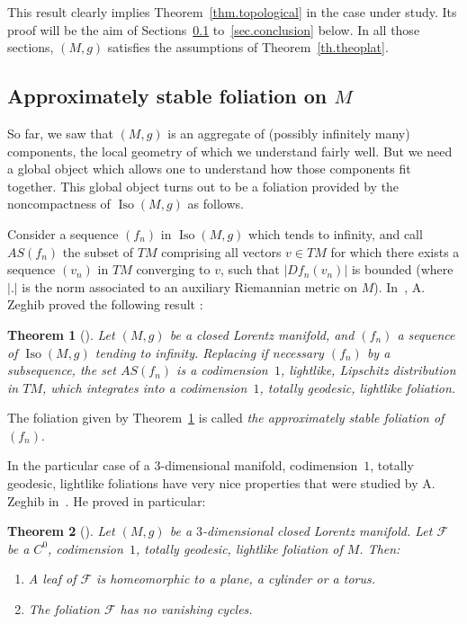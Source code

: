 \documentclass[11pt]{article}
\newtheorem{theo}{Theorem}[section]
\theoremstyle{definition}
\numberwithin{equation}{section}
\numberwithin{figure}{section}
\numberwithin{table}{section}
\DeclareMathOperator{\Iso}{Iso}
\newcommand{\calf}{\mathcal{F}}
\begin{document}
This result clearly implies Theorem~\ref{thm.topological} in the case under study. Its proof will be the aim of Sections~\ref{sec.approximately} to~\ref{sec.conclusion} below. In all those sections, $(M,g)$ satisfies the assumptions of Theorem~\ref{th.theoplat}.

\subsection{Approximately stable foliation on \texorpdfstring{${M}$}{M}}\label{sec.approximately}
So far, we saw that $(M,g)$ is an aggregate of (possibly infinitely many) components, the local geometry of which we understand fairly well. But we need a global object which allows one to understand how those components fit together. This global object turns out to be a foliation provided by the noncompactness of $\Iso(M,g)$ as follows.



Consider a sequence $(f_n)$ in $\Iso(M,g)$ which tends to infinity, and call $AS(f_n)$ the subset of $TM$ comprising all vectors $v \in TM$ for which there exists a sequence $(v_n)$ in $TM$ converging to $v$, such that $|Df_n(v_n)|$ is bounded (where $|.|$ is the norm associated to an auxiliary Riemannian metric on $M$). In~\cite{zeghibisom1}, A. Zeghib proved the following result :

\begin{theo}[{\cite[Theorem~1.2]{zeghibisom1}}]\label{theo.approximatively}
Let $(M,g)$ be a closed Lorentz manifold, and $(f_n)$ a sequence of $\Iso(M,g)$ tending to infinity. Replacing if necessary $(f_n)$ by a subsequence, the set $AS(f_n)$ is a codimension~$1$, lightlike, Lipschitz distribution in $TM$, which integrates into a codimension~$1$, totally geodesic, lightlike foliation.
\end{theo}

The foliation given by Theorem~\ref{theo.approximatively} is called \emph{the approximately stable foliation of~$(f_n)$}.

In the particular case of a $3$-dimensional manifold, codimension~$1$, totally geodesic, lightlike foliations have very nice properties that were studied by A. Zeghib in~\cite{zeghibfoliation}. He proved in particular:

\begin{theo}[{\cite[Theorem~11]{zeghibfoliation}}]\label{th.zeghibfol}
Let $(M,g)$ be a $3$-dimensional closed Lorentz manifold. Let $\calf$ be a $C^0$, codimension~$1$, totally geodesic, lightlike foliation of $M$. Then:
\begin{enumerate}
\item \label{8.3.1}A leaf of $\calf$ is homeomorphic to a plane, a cylinder or a torus.
\item \label{8.3.2}The foliation $\calf$ has no vanishing cycles.
\end{enumerate}
\end{theo}
\end{document}
